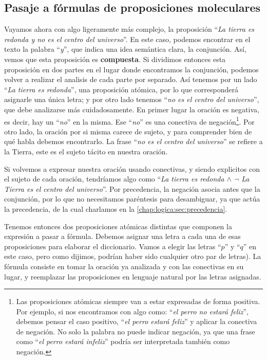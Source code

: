 \subsection{Pasaje a fórmulas de proposiciones moleculares}
\label{chap:logica_proposicional:subsec:pasaje_proposiciones_moleculares}

Vayamos ahora con algo ligeramente más complejo, la proposición ``\textit{La
tierra es redonda y no es el centro del universo}''. En este caso, podemos
encontrar en el texto la palabra ``\textit{y}'', que indica una idea semántica
clara, la conjunción. Así, vemos que esta proposición es \textbf{compuesta}. Si
dividimos entonces esta proposición en dos partes en el lugar donde encontramos
la conjunción, podemos volver a realizar el analisis de cada parte por separado.
Así tenemos por un lado ``\textit{La tierra es redonda}'', una proposición
atómica, por lo que corresponderá asignarle una única letra; y por otro lado
tenemos ``\textit{no es el centro del universo}'', que debe analizarse más
cuidadosamente. En primer lugar la oración es negativa, es decir, hay un
``\textit{no}'' en la misma. Ese ``\textit{no}'' es una conectiva de
negación\footnote{ Las proposiciones atómicas siempre van a estar expresadas de
forma positiva. Por ejemplo, si nos encontramos con algo como: ``\textit{el
perro no estará feliz}'', debemos pensar el caso positivo, ``\textit{el perro
estará feliz}'' y aplicar la conectiva de negación. No solo la palabra no puede
indicar negación, ya que una frase como ``\textit{el perro estará infeliz}''
podría ser interpretada también como negación. }. Por otro lado, la oración por
si misma carece de sujeto, y para comprender bien de qué habla debemos
encontrarlo. La frase ``\textit{no es el centro del universo}'' se refiere a la
Tierra, este es el sujeto tácito en nuestra oración.

Si volvemos a expresar nuestra oración usando conectivas, y siendo explicitos
con el sujeto de cada oración, tendríamos algo como  ``\textit{La tierra es
redonda $\land$ $\lnot$ La Tierra es el centro del universo}''. Por precedencia,
la negación asocia antes que la conjunción, por lo que no necesitamos paréntesis
para desambiguar, ya que actúa la precedencia, de la cual charlamos en la
\autoref{chap:logica:sec:precedencia}.

Tenemos entonces dos proposiciones atómicas distintas que componen la expresión
a pasar a fórmula. Debemos asignar una letra a cada una de esas proposiciones
para elaborar el diccionario. Vamos a elegir las letras ``$p$'' y ``$q$'' en
este caso, pero como dijimos, podrían haber sido cualquier otro par de letras).
La fórmula consiste en tomar la oración ya analizada y con las conectivas en su
lugar, y reemplazar las proposiciones en lenguaje natural por las letras
asignadas.

